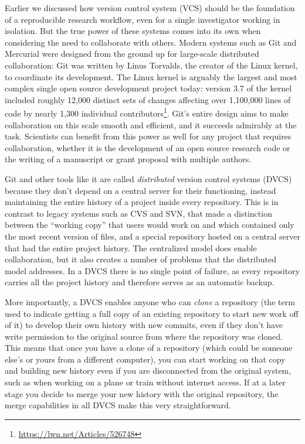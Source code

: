 \documentclass[ChapterTOCs,krantz2]{krantz} %
\theoremstyle{definition}
\begin{document}
Earlier we discussed how version control system (VCS) should be the foundation of a
reproducible research workflow, even for a single investigator working in
isolation.  But the true power of these systems comes into its own when
considering the need to collaborate with others.  Modern systems such as Git
and Mercurial were designed from the ground up for large-scale distributed
collaboration: Git was written by Linus Torvalds, the creator of the Linux
kernel, to coordinate its development.  The Linux kernel is arguably the
largest and most complex single open source development project today: version
3.7 of the kernel included roughly 12,000 distinct sets of changes affecting
over 1,100,000 lines of code by nearly 1,300 individual
contributors\footnote{\url{https://lwn.net/Articles/526748}}.  Git's entire
design aims to make collaboration on this scale smooth and efficient, and it
succeeds admirably at the task.  Scientists can benefit from this power as well
for any project that requires collaboration, whether it is the development of
an open source research code or the writing of a manuscript or grant proposal
with multiple authors.

Git and other tools like it are called \emph{distributed} version control
systems (DVCS) because they don't depend on a central server for their functioning,
instead maintaining the entire history of a project inside every repository.
This is in contrast to legacy systems such as CVS and SVN, that made a
distinction between the ``working copy'' that users would work on and which
contained only the most recent version of files, and a special repository
hosted on a central server that had the entire project history.  The
centralized model does enable collaboration, but it also creates a number of
problems that the distributed model addresses.  In a DVCS there is no single
point of failure, as every repository carries all the project history and
therefore serves as an automatic backup.

More importantly, a DVCS enables anyone who can \emph{clone} a repository (the
term used to indicate getting a full copy of an existing repository to start
new work off of it) to develop their own history with new commits, even if they
don't have write permission to the original source from where the repository
was cloned.  This means that once you have a clone of a repository (which could
be someone else's or yours from a different computer), you can start working on
that copy and building new history even if you are disconnected from the
original system, such as when working on a plane or train without internet
access.  If at a later stage you decide to merge your new history with the
original repository, the merge capabilities in all DVCS make this very
straightforward.
\end{document}
